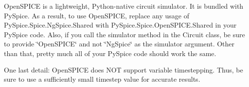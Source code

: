 \label{index_md_main}%
%
 Open\+SPICE is a lightweight, Python-\/native circuit simulator. It is bundled with Py\+Spice. As a result, to use Open\+SPICE, replace any usage of Py\+Spice.\+Spice.\+Ng\+Spice.\+Shared with Py\+Spice.\+Spice.\+Open\+SPICE.\+Shared in your Py\+Spice code. Also, if you call the simulator method in the Circuit class, be sure to provide \char`\"{}\+Open\+SPICE\char`\"{} and not \char`\"{}\+Ng\+Spice\char`\"{} as the simulator argument. Other than that, pretty much all of your Py\+Spice code should work the same.

One last detail\+: Open\+SPICE does NOT support variable timestepping. Thus, be sure to use a sufficiently small timestep value for accurate results. 